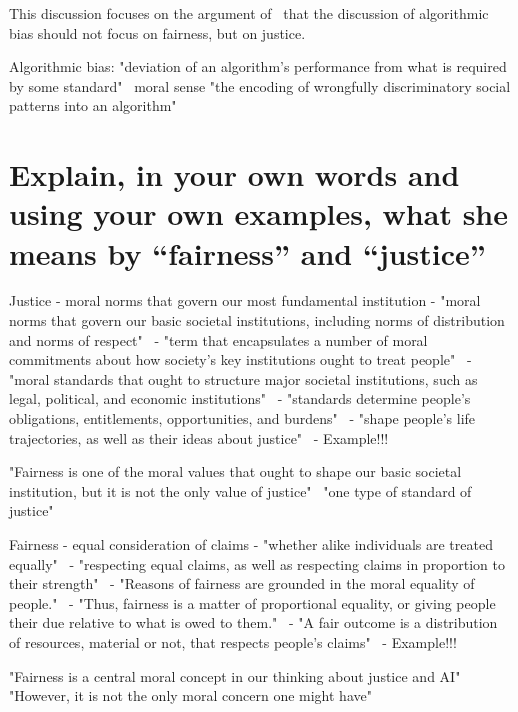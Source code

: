 
This discussion focuses on the argument of~\cite{vredenburgh} that the discussion of algorithmic bias should not focus on fairness, but on justice.

Algorithmic bias: "deviation of an
algorithm’s performance from what is required by some standard"~\parencite[][1]{vredenburgh}
moral sense
"the encoding of wrongfully discriminatory social patterns into an
algorithm"~\parencite[][2]{vredenburgh}

\section*{Explain, in your own words and using your own examples, what she means by “fairness” and “justice”}

Justice
- moral norms that govern our most fundamental institution
- "moral norms that govern our basic societal institutions, including norms of distribution and norms of respect"~\parencite[][3]{vredenburgh}
- "term that encapsulates a number of moral commitments about how society’s key institutions ought to treat people"~\parencite[][11]{vredenburgh}
- "moral standards that ought to structure major societal institutions, such as legal, political, and economic institutions"~\parencite[][11]{vredenburgh}
- "standards determine people’s obligations, entitlements, opportunities, and burdens"~\parencite[][12]{vredenburgh}
- "shape people’s life trajectories, as well as their ideas about justice"~\parencite[][12]{vredenburgh}
- Example!!!


"Fairness is one of the moral values that ought to shape our basic societal institution, but it is not the only value of justice"~\parencite[][3]{vredenburgh}
"one type of standard of justice"~\parencite[][11]{vredenburgh}


Fairness
- equal consideration of claims
- "whether alike individuals are treated equally"~\parencite[][3]{vredenburgh}
- "respecting equal claims, as well as respecting claims in proportion to their strength"~\parencite[][13]{vredenburgh}
- "Reasons of fairness are grounded in the moral equality of people."~\parencite[][13]{vredenburgh}
- "Thus, fairness is a matter of proportional equality, or giving people their due relative to what is owed to them."~\parencite[][13]{vredenburgh}
- "A fair outcome is a distribution of resources, material or not, that respects people’s claims"~\parencite[][13]{vredenburgh}
- Example!!!

"Fairness is a central moral concept in our thinking about justice and AI"~\parencite[][13]{vredenburgh}
"However, it is not the only moral concern one might have"~\parencite[][13]{vredenburgh}

